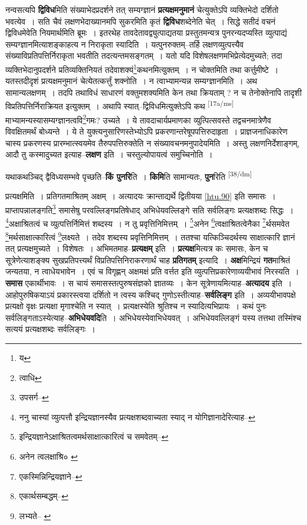 \documentclass[article,12pt,a4paper]{memoir}
\begin{document}
	  \pstart नन्वसत्यपि \textbf{द्विविध}मिति संख्याभेदप्रदर्शने तत् सम्यग्ज्ञानं \textbf{प्रत्यक्षमनुमानं} चेत्युक्तेऽपि व्यक्तिभेदो दर्शितो भवत्येव । सति चैवं लक्षणभेदाख्यानमपि सुकरमिति कृतं \textbf{द्विविध}शब्देनेति चेत् । सिद्धे सतीदं वचनं द्विविधमेवेति नियमार्थमिति ब्रूमः । इतरथेह तावदेतावद्व्युत्पाद्यतया प्रस्तुतमन्यत्र पुनरन्यदप्यस्ति व्युत्पाद्यं सम्यग्ज्ञानमित्याशङ्काहत्य न निराकृता स्यादिति । यत्पुनरुक्तम्--तर्हि लक्षणव्युत्पत्त्यैव संख्याविप्रतिपत्तिर्निराकृता भवतीति तदत्यन्तमसङ्गतम् । यतो यदि विशेषलक्षणमभिप्रेत्येदमुच्यते; तदा व्यक्तिभेदानुपदर्शने प्रतिव्यक्तिनियतं तदेवाशक्यं\footnote{य}कथनमित्युक्तम् । न चोक्तमिति तथा कर्त्तुमीष्टे । यतस्तदीदृशं प्रत्यक्षमनुमानं चेत्येतत्कर्त्तुं शक्नोति । न त्वाभ्यामन्यन्न सम्यग्ज्ञानमिति । अथ सामान्यलक्षणम् । तदपि तथाविधं साधारणं वक्तुमशक्यमिति केन तथा क्रियताम् ? न च तेनोक्तेनापि तादृशी विप्रतिपत्तिर्निराक्रियत इत्युक्तम् । अथापि स्यात्--द्विविधमित्युक्तेऽपि कथ \leavevmode\textsuperscript{\rmlatinfont\tiny [17a/ms]} माभ्यामन्यस्यासम्यग्ज्ञानत्ववि\footnote{त्वाधि}गमः? उच्यते । ये तावदाचार्यप्रमाणका व्युत्पित्सवस्ते तद्वचनमात्रेणैव विवक्षितमर्थं बोध्यन्ते । ये ते युक्त्यनुसारिणस्तेभ्योऽपि प्रकरणान्तरेषूपपत्तिरुदाहृता । प्राज्ञजनाधिकारेण चास्य प्रकरणस्य प्रारम्भात्स्वयमेव तैरुपपत्तिरुक्तेति न संख्यावचनमनुपादेयमिति । अस्तु लक्षणनिर्देशाङ्गम्, आदौ तु कस्मादुच्यत इत्याह--\textbf{लक्षण} इति । चस्तुल्योपायत्वं समुच्चिनोति ।
	\pend
      

	  \pstart यथाकथञ्चिद् द्वैविध्यसम्भवे पृच्छति--\textbf{किं पुनरि}ति । \textbf{किमि}ति सामान्यतः, \textbf{पुन}रिति \leavevmode\textsuperscript{\rmlatinfont\tiny [38/dm]} 
	  
	प्रत्यक्षमिति । प्रतिगतमाश्रितम् अक्षम् । अत्यादयः क्रान्ताद्यर्थे द्वितीयया \cref{htu.90} इति समासः । प्राप्तापन्नालङ्गति\footnote{उपसर्ग--\cite{dp-msD-n}} समासेषु परवल्लिङ्गप्रतिषेधाद् अभिधेयवल्लिङ्गे सति सर्वलिङ्गः प्रत्यक्षशब्दः सिद्धः । \footnote{ननु चास्यां व्युत्पत्तौ इन्द्रियज्ञानस्यैव प्रत्यक्षशब्दवाच्यता स्याद् न योगिज्ञानादेरित्याह--\cite{dp-msD-n}}अक्षाश्रितत्वं च व्युत्पत्तिर्निमित्तं शब्दस्य । न तु प्रवृत्तिनिमित्तम् । \footnote{इन्द्रियज्ञानेऽक्षाश्रितत्वमर्थसाक्षात्कारित्वं च समवेतम्--\cite{dp-msD-n}}अनेन \footnote{अनेन त्वलक्षाश्रि० \cite{dp-msA}}त्वक्षाश्रितत्वेनैका \footnote{एकस्मिन्निन्द्रियज्ञाने--\cite{dp-msD-n}}र्थसमवेत \footnote{एकार्थसम्बद्धम्--\cite{dp-msD-n}}मर्थसाक्षात्कारित्वं \footnote{लभ्यते--\cite{dp-msB} \cite{dp-edN}}लक्ष्यते । तदेव शब्दस्य प्रवृत्तिनिमित्तम् । ततश्चा यत्किञ्चिदर्थस्य साक्षात्कारि ज्ञानं तत् प्रत्यक्षमुच्यते । विशेषतः । अभिमतमाह--\textbf{प्रत्यक्षम्} इति । \textbf{प्रत्यक्ष}मित्यत्र कः समासः, केन च सूत्रेणेत्याशङ्क्य सुखप्रतिपत्त्यर्थं विप्रतिपत्तिनिराकरणार्थं चाह \textbf{प्रतिगतम्} इत्यादि । \textbf{अक्ष}मिन्द्रियं \textbf{गत}माश्रितं जन्यतया, न त्वाधेयभावेन । एवं च विगृह्णन् अक्षमक्षं प्रति वर्त्तत इति व्युत्पत्तिप्रकारेणाव्ययीभावं निरस्यति । \textbf{समास} एकार्थीभावः । स चायं समासस्तत्पुरुषसंज्ञको ज्ञातव्यः । केन सूत्रेणायमित्याह--\textbf{अत्यादय} इति । आहोपुरुषिकयाऽयं प्रकारस्त्वया दर्शितो न त्वस्य कश्चिद् गुणोऽस्तीत्याह--\textbf{सर्वलिङ्ग} इति । अव्ययीभावपक्षे प्रत्यक्षो वृक्षः प्रत्यक्षा मृगाश्चेति न स्यात् । प्रत्यक्षस्येति श्रुतिश्च न स्यादित्यभिप्रायः । कथं पुनः सर्वलिङ्गताऽस्येत्याह--\textbf{अभिधेयवदि}ति । अभिधेयस्येवाभिधेयवत् । अभिधेयवल्लिङ्गं यस्य तत्तथा तस्मिंश्च सत्ययं प्रत्यक्षशब्दः सर्वलिङ्गः ।
	\pend
      
\end{document}
